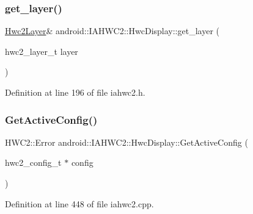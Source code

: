 \subsubsection{\texorpdfstring{get\+\_\+layer()}{get\_layer()}}
{\footnotesize\ttfamily \mbox{\hyperlink{classandroid_1_1IAHWC2_1_1Hwc2Layer}{Hwc2\+Layer}}\& android\+::\+I\+A\+H\+W\+C2\+::\+Hwc\+Display\+::get\+\_\+layer (\begin{DoxyParamCaption}\item[{hwc2\+\_\+layer\+\_\+t}]{layer }\end{DoxyParamCaption})\hspace{0.3cm}{\ttfamily [inline]}}



Definition at line 196 of file iahwc2.\+h.


\begin{DoxyCode}{0}
\end{DoxyCode}
\mbox{\label{classandroid_1_1IAHWC2_1_1HwcDisplay_af4afd09113abd2aeb5ad4f589f2e2925}} 
\subsubsection{\texorpdfstring{Get\+Active\+Config()}{GetActiveConfig()}}
{\footnotesize\ttfamily H\+W\+C2\+::\+Error android\+::\+I\+A\+H\+W\+C2\+::\+Hwc\+Display\+::\+Get\+Active\+Config (\begin{DoxyParamCaption}\item[{hwc2\+\_\+config\+\_\+t $\ast$}]{config }\end{DoxyParamCaption})}



Definition at line 448 of file iahwc2.\+cpp.


